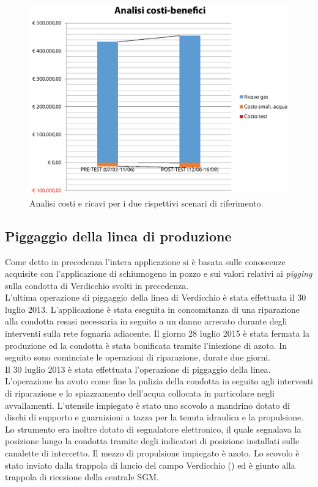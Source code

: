 \begin{figure}[htbp]
    \centering
    \includegraphics[width=\textwidth]{fig/test/graphs/costi-benefici.eps}
    \caption{Analisi costi e ricavi per i due rispettivi scenari di riferimento.} 
    \label{fig:costi-benefici}
\end{figure}


\subsection{Piggaggio della linea di produzione}
Come detto in precedenza l'intera applicazione si è basata sulle conoscenze acquisite con l'applicazione di schiumogeno in pozzo e sui valori relativi ai \textit{pigging} sulla condotta di Verdicchio svolti in precedenza.\\
L'ultima operazione di piggaggio della linea di Verdicchio è stata effettuata il 30 luglio 2013. L'applicazione è stata eseguita in concomitanza di una riparazione alla condotta resasi necessaria in seguito a un danno arrecato durante degli interventi sulla rete fognaria adiacente. Il giorno 28 luglio 2015 è stata fermata la produzione ed la condotta è stata bonificata tramite l'iniezione di azoto. In seguito sono cominciate le operazioni di riparazione, durate due giorni.\\
Il 30 luglio 2013 è stata effettuata l'operazione di piggaggio della linea. L'operazione ha avuto come fine la pulizia della condotta in seguito agli interventi di riparazione e lo spiazzamento dell'acqua collocata in particolare negli avvallamenti. L'utensile impiegato è stato uno scovolo a mandrino dotato di dischi di supporto e guarnizioni a tazza per la tenuta idraulica e la propulsione. Lo strumento era inoltre dotato di segnalatore elettronico, il quale segnalava la posizione lungo la condotta tramite degli indicatori di posizione installati sulle canalette di intercetto. Il mezzo di propulsione impiegato è azoto. Lo scovolo è stato inviato dalla trappola di lancio del campo Verdicchio () ed è giunto alla trappola di ricezione della centrale SGM.

